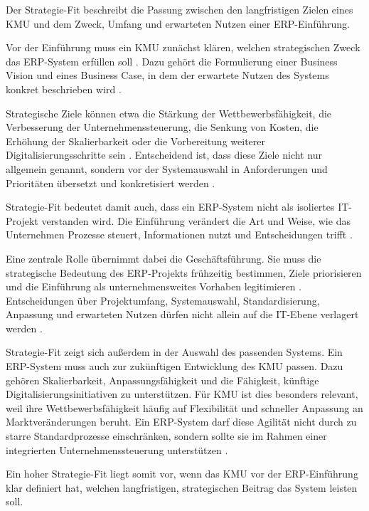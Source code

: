 
Der Strategie-Fit beschreibt die Passung zwischen den langfristigen Zielen
eines KMU und dem Zweck, Umfang und erwarteten Nutzen einer ERP-Einführung.

Vor der Einführung muss ein KMU zunächst klären, welchen strategischen Zweck
das ERP-System erfüllen soll \parencite{Leyh2015}. Dazu gehört die Formulierung einer Business
Vision und eines Business Case, in dem der erwartete Nutzen des Systems
konkret beschrieben wird \parencite{Leyh2015}. 

Strategische Ziele können etwa die Stärkung der
Wettbewerbsfähigkeit, die Verbesserung der Unternehmenssteuerung, die
Senkung von Kosten, die Erhöhung der Skalierbarkeit oder die Vorbereitung
weiterer Digitalisierungsschritte sein \parencite{Leyh2015}. Entscheidend ist, dass diese Ziele
nicht nur allgemein genannt, sondern vor der Systemauswahl in Anforderungen
und Prioritäten übersetzt und konkretisiert werden \parencite{Jha2008,Leyh2015}.

Strategie-Fit bedeutet damit auch, dass ein ERP-System nicht als isoliertes
IT-Projekt verstanden wird. Die Einführung verändert die Art und Weise, wie das Unternehmen Prozesse steuert,
Informationen nutzt und Entscheidungen trifft \parencite{Leyh2017}.

Eine zentrale Rolle übernimmt dabei die Geschäftsführung. Sie muss die
strategische Bedeutung des ERP-Projekts frühzeitig bestimmen, Ziele
priorisieren und die Einführung als unternehmensweites Vorhaben legitimieren \parencite{Leyh2015}.
Entscheidungen über Projektumfang, Systemauswahl,
Standardisierung, Anpassung und erwarteten Nutzen dürfen nicht allein auf die
IT-Ebene verlagert werden \parencite{Leyh2015}.

Strategie-Fit zeigt sich außerdem in der Auswahl des passenden Systems. Ein
ERP-System muss auch zur
zukünftigen Entwicklung des KMU passen. Dazu gehören Skalierbarkeit,
Anpassungsfähigkeit und die Fähigkeit, künftige Digitalisierungsinitiativen
zu unterstützen. Für KMU ist dies besonders relevant, weil ihre
Wettbewerbsfähigkeit häufig auf Flexibilität und schneller Anpassung an
Marktveränderungen beruht. Ein ERP-System darf diese Agilität nicht durch
zu starre Standardprozesse einschränken, sondern sollte sie im Rahmen einer
integrierten Unternehmenssteuerung unterstützen \parencite{Leyh2015,Leyh2017}.


Ein hoher Strategie-Fit liegt somit vor, wenn das KMU vor der
ERP-Einführung klar definiert hat, welchen langfristigen, strategischen Beitrag das System
leisten soll.